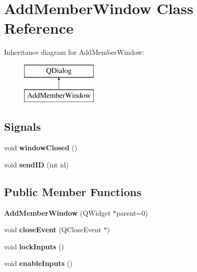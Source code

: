 \hypertarget{class_add_member_window}{}\section{Add\+Member\+Window Class Reference}
\label{class_add_member_window}
Inheritance diagram for Add\+Member\+Window\+:\begin{figure}[H]
\begin{center}
\leavevmode
\includegraphics[height=2.000000cm]{class_add_member_window}
\end{center}
\end{figure}
\subsection*{Signals}
\begin{DoxyCompactItemize}
\item 
\mbox{\label{class_add_member_window_aad17b73e13195ed031bc96c0f2a2978a}} 
void {\bfseries window\+Closed} ()
\item 
\mbox{\label{class_add_member_window_af22f84c3e7d64690bb306918bc4b6607}} 
void {\bfseries send\+ID} (int id)
\end{DoxyCompactItemize}
\subsection*{Public Member Functions}
\begin{DoxyCompactItemize}
\item 
\mbox{\label{class_add_member_window_a849e43bc02f9d4f8c653836ddb6ffc49}} 
{\bfseries Add\+Member\+Window} (Q\+Widget $\ast$parent=0)
\item 
\mbox{\label{class_add_member_window_aa7dbc5fe197bd8b09313d9cc05df56f4}} 
void {\bfseries close\+Event} (Q\+Close\+Event $\ast$)
\item 
\mbox{\label{class_add_member_window_a4633f09d41fd29df4ba2dffb8d27f923}} 
void {\bfseries lock\+Inputs} ()
\item 
\mbox{\label{class_add_member_window_a8cf90e1e7b2345147c0622a6188d9de3}} 
void {\bfseries enable\+Inputs} ()
\end{DoxyCompactItemize}
